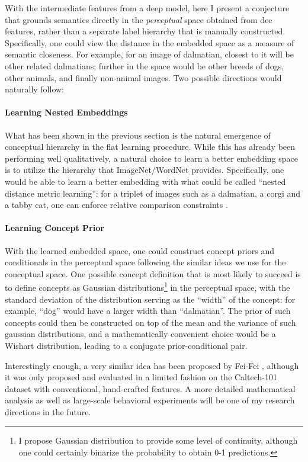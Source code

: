 With the intermediate features from a deep model, here I present a conjecture that grounds semantics directly in the \emph{perceptual} space obtained from dee features, rather than a separate label hierarchy that is manually constructed. Specifically, one could view the distance in the embedded space as a measure of semantic closeness. For example, for an image of dalmatian, closest to it will be other related dalmatians; further in the space would be other breeds of dogs, other animals, and finally non-animal images. Two possible directions would naturally follow:

\paragraph{Learning Nested Embeddings} What has been shown in the previous section is the natural emergence of conceptual hierarchy in the flat learning procedure. While this has already been performing well qualitatively, a natural choice to learn a better embedding space is to utilize the hierarchy that ImageNet/WordNet provides. Specifically, one would be able to learn a better embedding with what could be called ``nested distance metric learning'': for a triplet of images such as a dalmatian, a corgi and a tabby cat, one can enforce relative comparison constraints \cite{schultz2003learning}.

\paragraph{Learning Concept Prior} With the learned embedded space, one could construct concept priors and conditionals in the perceptual space following the similar ideas we use for the conceptual space. One possible concept definition that is most likely to succeed is to define concepts as Gaussian distributions\footnote{I propose Gaussian distribution to provide some level of continuity, although one could certainly binarize the probability to obtain 0-1 predictions.} in the perceptual space, with the standard deviation of the distribution serving as the ``width'' of the concept: for example, ``dog'' would have a larger width than ``dalmatian''. The prior of such concepts could then be constructed on top of the mean and the variance of such gaussian distributions, and a mathematically convenient choice would be a Wishart distribution, leading to a conjugate prior-conditional pair.

Interestingly enough, a very similar idea has been proposed by Fei-Fei \etal \cite{fei2006one}, although it was only proposed and evaluated in a limited fashion on the Caltech-101 dataset with conventional, hand-crafted features. A more detailed mathematical analysis as well as large-scale behavioral experiments will be one of my research directions in the future.


